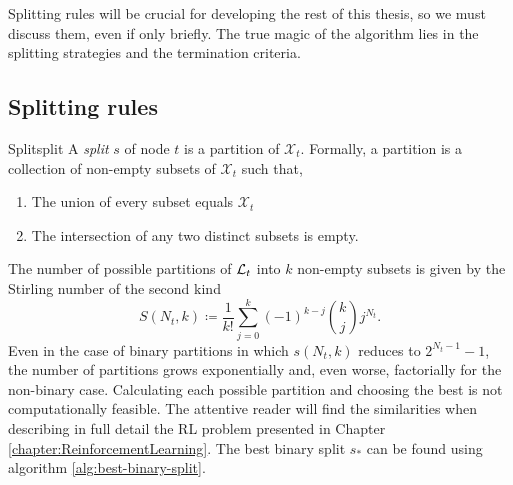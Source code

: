 Splitting rules will be crucial for developing the rest of this thesis, so we
must discuss them, even if only briefly. The true magic of the algorithm lies in
the splitting strategies and the termination criteria.

\subsection{Splitting rules}

\begin{dfn}{Split}{split}
    A \emph{split} $s$ of node $t$ is a partition of $\mathcal{X}_t$. Formally, a partition is a collection of non-empty subsets of $\mathcal{X}_t$ such that,
    \begin{enumerate}
        \item The union of every subset equals $\mathcal{X}_t$
        \item The intersection of any two distinct subsets is empty.
    \end{enumerate}
\end{dfn}

The number of possible partitions of $\mathcal{L}_t$ into $k$ non-empty subsets is given
by the Stirling number of the second kind \cite{louppe2014}
\begin{equation*}
    S(N_t, k) \coloneqq \frac{1}{k!} \sum_{j=0}^{k} (-1)^{k-j} \binom{k}{j} j^{N_t}.
\end{equation*}
Even in the case of binary partitions in which $s(N_t, k)$ reduces to $2^{N_t
-1}-1$, the number of partitions grows exponentially and, even worse,
factorially for the non-binary case. Calculating each possible partition and
choosing the best is not computationally feasible. The attentive reader will
find the similarities when describing in full detail the RL problem presented in
Chapter \ref{chapter:ReinforcementLearning}. The best binary split $s_*$ can be
found using algorithm \ref{alg:best-binary-split}.

\begin{algorithm}
    \caption{Find best binary split $s_*$ for node $t$ \cite[Ch.~3.6.3]{louppe2014}.}
    \label{alg:best-binary-split}
\end{algorithm}

